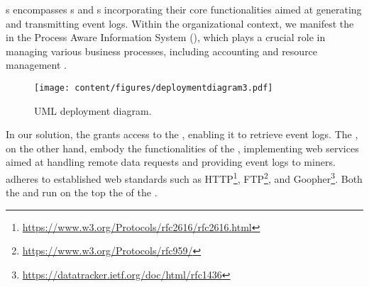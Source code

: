 s encompasses s and s incorporating their core functionalities aimed at generating and transmitting event logs. Within the organizational context, we manifest the  in the Process Aware Information System (), which plays a crucial role in managing various business processes, including accounting and resource management \cite{Dumas.etal/2018:FundamentalsofBPM}.
\begin{figure}[t]
	\centering
	\texttt{[image: content/figures/deploymentdiagram3.pdf]}
	\caption{UML deployment diagram.}
	\label{fig:deployment_diagram}
\end{figure}
In our solution, the  grants access to the , enabling it to retrieve event logs. The , on the other hand, embody the functionalities of the , implementing web services aimed at handling remote data requests and providing event logs to miners.  adheres to established web standards such as HTTP\footnote{\url{https://www.w3.org/Protocols/rfc2616/rfc2616.html}}, FTP\footnote{\url{https://www.w3.org/Protocols/rfc959/}}, and Goopher\footnote{\url{https://datatracker.ietf.org/doc/html/rfc1436}}. Both the  and  run on the top the  of the .



